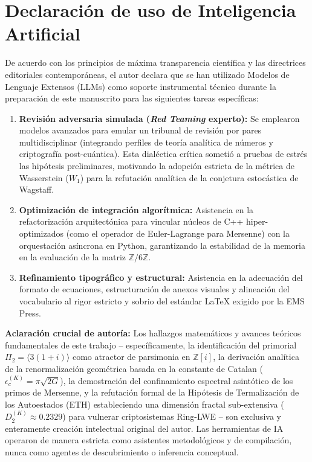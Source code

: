 \documentclass{article}
\numberwithin{equation}{section}
\theoremstyle{plain}
\theoremstyle{definition}
\begin{document}
\section*{Declaración de uso de Inteligencia Artificial}
De acuerdo con los principios de máxima transparencia científica y las directrices editoriales contemporáneas, el autor declara que se han utilizado Modelos de Lenguaje Extensos (LLMs) como soporte instrumental técnico durante la preparación de este manuscrito para las siguientes tareas específicas:

\begin{enumerate}
    \item \textbf{Revisión adversaria simulada (\textit{Red Teaming} experto):} Se emplearon modelos avanzados para emular un tribunal de revisión por pares multidisciplinar (integrando perfiles de teoría analítica de números y criptografía post-cuántica). Esta dialéctica crítica sometió a pruebas de estrés las hipótesis preliminares, motivando la adopción estricta de la métrica de Wasserstein ($W_1$) para la refutación analítica de la conjetura estocástica de Wagstaff.
    \item \textbf{Optimización de integración algorítmica:} Asistencia en la refactorización arquitectónica para vincular núcleos de C++ hiper-optimizados (como el operador de Euler-Lagrange para Mersenne) con la orquestación asíncrona en Python, garantizando la estabilidad de la memoria en la evaluación de la matriz $\mathbb{Z}/6\mathbb{Z}$.
    \item \textbf{Refinamiento tipográfico y estructural:} Asistencia en la adecuación del formato de ecuaciones, estructuración de anexos visuales y alineación del vocabulario al rigor estricto y sobrio del estándar LaTeX exigido por la EMS Press.
\end{enumerate}

\textbf{Aclaración crucial de autoría:} Los hallazgos matemáticos y avances teóricos fundamentales de este trabajo -- específicamente, la identificación del primorial $\Pi_2 = \langle 3(1+i) \rangle$ como atractor de parsimonia en $\mathbb{Z}[i]$, la derivación analítica de la renormalización geométrica basada en la constante de Catalan ($\epsilon_c^{(K)} = \pi\sqrt{2G}$), la demostración del confinamiento espectral asintótico de los primos de Mersenne, y la refutación formal de la Hipótesis de Termalización de los Autoestados (ETH) estableciendo una dimensión fractal sub-extensiva ($D_2^{(K)} \approx 0.2329$) para vulnerar criptosistemas Ring-LWE -- son exclusiva y enteramente creación intelectual original del autor. Las herramientas de IA operaron de manera estricta como asistentes metodológicos y de compilación, nunca como agentes de descubrimiento o inferencia conceptual.
\end{document}
